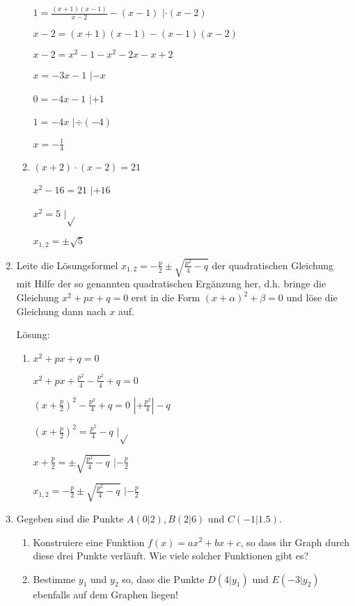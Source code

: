 \documentclass[main.tex]{subfiles}
\begin{document}
\begin{enumerate}
\begin{enumerate}
		            \(  1 = \frac{ (x+1)(x-1) }{ x-2 } - (x - 1) \) \( | \cdot (x - 2) \)

		            \( x - 2 = (x + 1)(x - 1) - (x - 1) (x - 2) \)

		            \( x-2 = x^2 - 1 - x^2 -2x -x +2 \)

		            \( x  = -3x -1  \) \( | -x  \)

		            \( 0 = -4x -1  \) \( | +1 \)

		            \( 1 = -4x \) \( | \div (-4) \)

		            \( x = -\frac{1}{4} \)
		      \item \( (x + 2) \cdot (x- 2) = 21 \)

		            \( x^2 - 16 = 21 \) \( | +16 \)

		            \( x^2 = 5  \) \( |\sqrt{} \)

		            \( x_{1,2} = \pm \sqrt{5} \)
	      \end{enumerate}
	\item Leite die Lösungsformel \( x_{1,2} = - \frac{p}{2} \pm \sqrt{ \frac{p^2}{4} - q } \)
	      der quadratischen Gleichung mit Hilfe der so genannten quadratischen Ergänzung her,
	      d.h. bringe die Gleichung \( x^2 + px + q = 0 \) erst in die Form
	      \( (x + \alpha)^2 + \beta = 0 \) und löse die Gleichung dann nach \( x \) auf.

	      Lösung:
	      \begin{enumerate}
		      \item \( x^2 + px + q = 0 \)

		            \( x^2 + px + \frac{p^2}{4} - \frac{p^2}{4} + q = 0\)

		            \( (x + \frac{p}{2} )^2 - \frac{p^2}{4} + q = 0 \)  \( |+ \frac{p^2}{4} | - q \)

		            \( (x + \frac{p}{2} )^2 = \frac{p^2}{4} - q \) \( |\sqrt{} \)

		            \( x + \frac{p}{2} = \pm \sqrt{ \frac{p^2}{4} - q }\) \( |- \frac{p}{2} \)

		            \( x_{1,2} = -\frac{p}{2} \pm \sqrt{ \frac{p^2}{4} - q }\) \( |- \frac{p}{2} \)
	      \end{enumerate}
	\item Gegeben sind die Punkte \( A(0|2), B(2|6) \) und \( C(-1|1.5) \).
	      \begin{enumerate}
		      \item Konstruiere eine Funktion \( f(x) = ax^2 + bx + c \), so dass ihr Graph durch
		            diese drei Punkte verläuft.
		            Wie viele solcher Funktionen gibt es?
		      \item Bestimme \( y_1 \) und \( y_2 \) so, dass die Punkte
		            \( D(4|y_1) \) und \( E(-3|y_2) \) ebenfalls auf dem Graphen liegen!
	      \end{enumerate}


\end{enumerate}
\end{document}
